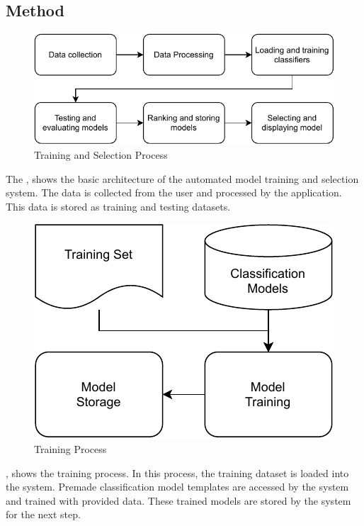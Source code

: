 \subsection{Method} \label{subsec:method}

\begin{figure}[ht]
    \centering
    \includegraphics[width=1.2\columnwidth]{media/ch_dataset_and_methods/data_flow_system.pdf}
    \caption{Training and Selection Process}
    \label{fig:data_flow_in_system}
\end{figure}

The , shows the basic architecture of the automated model training and selection system. The data is collected from the user and processed by the application. This data is stored as training and testing datasets.

\begin{figure}[ht]
    \centering
    \includegraphics[width=0.7\columnwidth]{media/ch_dataset_and_methods/trainer.pdf}
    \caption{Training Process}
    \label{fig:training_process}
\end{figure}

, shows the training process. In this process, the training dataset is loaded into the system. Premade classification model templates are accessed by the system and trained with provided data. These trained models are stored by the system for the next step.

